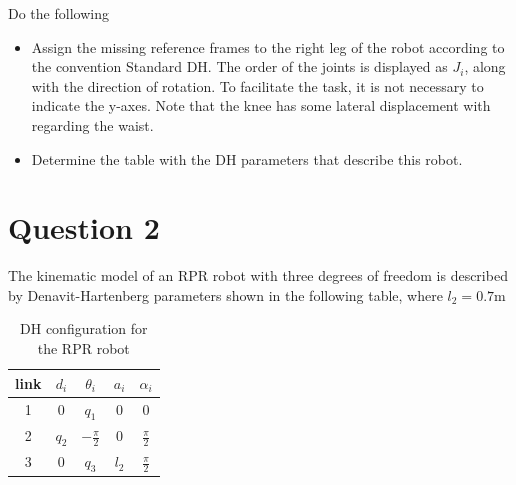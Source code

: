 \documentclass[letterpaper,pdftex]{article}
\begin{document}
Do the following

\begin{itemize}
\item Assign the missing reference frames to the right leg of the robot according to the convention Standard DH. The order of the joints is displayed as $J_i$, along with the direction of rotation. To facilitate the task, it is not necessary to indicate the y-axes. Note that the knee has some lateral displacement with regarding the waist.
\item Determine the table with the DH parameters that describe this robot.
\end{itemize}

\section{Question 2}

The kinematic model of an RPR robot with three degrees of freedom is described by Denavit-Hartenberg parameters shown in the following table, where $l_2 = 0.7$m


\begin{table}
\begin{centering}
\begin{tabular}{|c|c|c|c|c|}
\hline 
link & $d_{i}$ & $\theta_{i}$ & $a_{i}$ & $\alpha_{i}$\tabularnewline
\hline 
\hline 
1 & 0 & $q_{1}$ & 0 & 0\tabularnewline
\hline 
2 & $q_{2}$ & $-\frac{\pi}{2}$ & 0 & $\frac{\pi}{2}$\tabularnewline
\hline 
3 & 0 & $q_{3}$ & $l_{2}$ & $\frac{\pi}{2}$\tabularnewline
\hline 
\end{tabular}
\par\end{centering}
\caption{DH configuration for the RPR robot}

\end{table}
\end{document}
